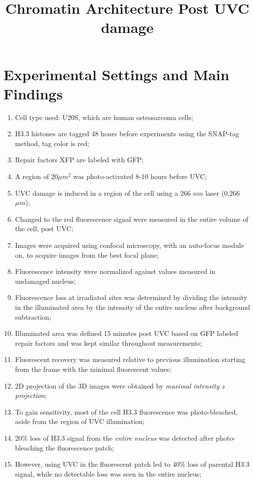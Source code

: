 \documentclass[12pt]{report}
\begin{document}
	
	\title{Chromatin Architecture Post UVC damage}
	\maketitle
	\section{Experimental Settings and Main Findings}
	\begin{enumerate}
		\item Cell type used: U20S, which are human osteosarcoma cells;
		\item H3.3 histones are tagged 48 hours before experiments using the SNAP-tag method, tag color is red;
		\item Repair factors XFP are labeled with GFP;
		\item A region of $20 \mu m^2$ was photo-activated 8-10 hours before UVC;
		\item UVC damage is induced in a region of the cell using a 266 $nm$ laser (0.266 $\mu m$);
		\item Changed to the red fluorescence signal were measured in the entire volume of the cell, post UVC;
		\item Images were acquired using confocal microscopy, with an auto-focus module on, to acquire images from the best focal plane;
		\item Fluorescence intensity were normalized against values measured in undamaged nucleus;
		\item Fluorescence loss at irradiated sites was determined by dividing the intensity in the illuminated area by the intensity of the entire nucleus after background subtraction;
		\item Illuminated area was defined 15 minutes post UVC based on GFP labeled repair factors and was kept similar throughout measurements;
		\item Fluorescent recovery was measured relative to previous illumination starting from the frame with the minimal fluorescent values;
		\item 2D projection of the 3D images were obtained by \textit{maximal intensity z projection};
		\item To gain sensitivity, most of the cell H3.3 fluorescence was photo-bleached, aside from the region of UVC illumination;
		\item 20\% loss of H3.3 signal from the \textit{entire nucleus} was detected after photo-bleaching the fluorescence patch;
		\item However, using UVC in the fluorescent patch led to 40\% loss of parental H3.3 signal, while no detectable loss was seen in the entire nucleus;

\end{enumerate}
\end{document}
